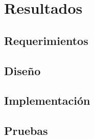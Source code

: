 
\chapter{Resultados}

\section{Requerimientos}

\section{Diseño}

\section{Implementación}

\section{Pruebas}
